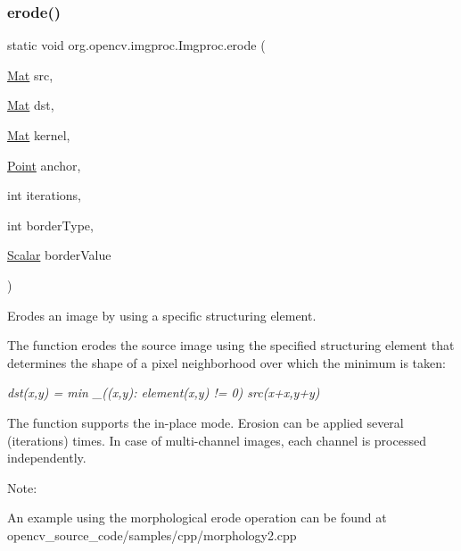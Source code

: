 \subsubsection{\texorpdfstring{erode()}{erode()}\hspace{0.1cm}{\footnotesize\ttfamily [1/3]}}
{\footnotesize\ttfamily static void org.\+opencv.\+imgproc.\+Imgproc.\+erode (\begin{DoxyParamCaption}\item[{\mbox{\hyperlink{classorg_1_1opencv_1_1core_1_1_mat}{Mat}}}]{src,  }\item[{\mbox{\hyperlink{classorg_1_1opencv_1_1core_1_1_mat}{Mat}}}]{dst,  }\item[{\mbox{\hyperlink{classorg_1_1opencv_1_1core_1_1_mat}{Mat}}}]{kernel,  }\item[{\mbox{\hyperlink{classorg_1_1opencv_1_1core_1_1_point}{Point}}}]{anchor,  }\item[{int}]{iterations,  }\item[{int}]{border\+Type,  }\item[{\mbox{\hyperlink{classorg_1_1opencv_1_1core_1_1_scalar}{Scalar}}}]{border\+Value }\end{DoxyParamCaption})\hspace{0.3cm}{\ttfamily [static]}}

Erodes an image by using a specific structuring element.

The function erodes the source image using the specified structuring element that determines the shape of a pixel neighborhood over which the minimum is taken\+:

{\itshape dst(x,y) = min \+\_\+((x\textquotesingle{},y\textquotesingle{})\+: element(x\textquotesingle{},y\textquotesingle{}) != 0) src(x+x\textquotesingle{},y+y\textquotesingle{})}

The function supports the in-\/place mode. Erosion can be applied several ({\ttfamily iterations}) times. In case of multi-\/channel images, each channel is processed independently.

Note\+:


\begin{DoxyItemize}
\item An example using the morphological erode operation can be found at opencv\+\_\+source\+\_\+code/samples/cpp/morphology2.\+cpp 
\end{DoxyItemize}


